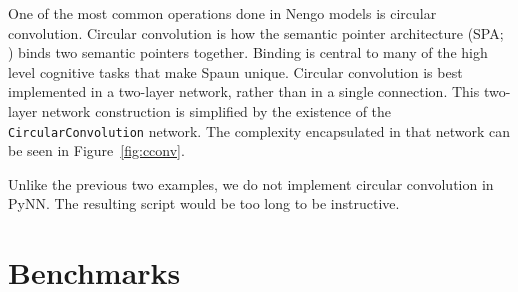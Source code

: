 \documentclass{frontiersSCNS}
\begin{document}
One of the most common operations done
in Nengo models is circular convolution.
Circular convolution is how
the semantic pointer architecture
(SPA; \cite{TODO})
binds two semantic pointers together.
Binding is central to many
of the high level cognitive tasks
that make Spaun unique.
Circular convolution
is best implemented in a two-layer network,
rather than in a single connection.
This two-layer network construction is simplified
by the existence of the \texttt{CircularConvolution} network.
The complexity encapsulated in that network
can be seen in Figure~\ref{fig:cconv}.

Unlike the previous two examples,
we do not implement
circular convolution in PyNN.
The resulting script would be
too long to be instructive.

\section{Benchmarks}
\end{document}
